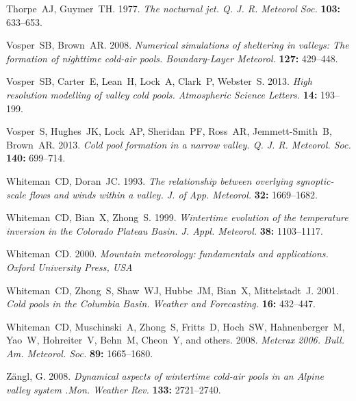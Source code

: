 \documentclass[times]{qjrms4}
\begin{document}
\begin{thebibliography}{99}
Thorpe~AJ, Guymer~TH. 1977. \emph{The nocturnal jet. Q. J. R. Meteorol Soc.} {\bf 103:} 633--653.

Vosper~SB, Brown~AR. 2008. \emph{Numerical simulations of sheltering in valleys: The formation of nighttime cold-air pools. Boundary-Layer Meteorol.} {\bf 127:} 429--448.

Vosper~SB, Carter~E, Lean~H, Lock~A, Clark~P, Webster~S. 2013. \emph{High resolution modelling of valley cold pools. Atmospheric Science Letters.} {\bf 14:} 193--199.

Vosper~S, Hughes~JK, Lock~AP, Sheridan~PF, Ross~AR, Jemmett-Smith~B, Brown~AR. 2013. \emph{Cold pool formation in a narrow valley. Q. J. R. Meteorol. Soc.} {\bf 140:} 699--714.

Whiteman~CD, Doran~JC. 1993. \emph{The relationship between overlying synoptic-scale flows and winds within a valley. J. of App. Meteorol.} {\bf 32:} 1669--1682.

Whiteman~CD, Bian~X, Zhong~S. 1999. \emph{Wintertime evolution of the temperature inversion in the Colorado Plateau Basin. J. Appl. Meteorol.} {\bf 38:} 1103--1117.

Whiteman~CD. 2000. \emph{Mountain meteorology: fundamentals and applications. Oxford University Press, USA}

Whiteman~CD, Zhong~S, Shaw~WJ, Hubbe~JM, Bian~X, Mittelstadt~J. 2001. \emph{Cold pools in the Columbia Basin. Weather and Forecasting.} {\bf 16:} 432--447.

Whiteman~CD, Muschinski~A, Zhong~S, Fritts~D, Hoch~SW, Hahnenberger~M, Yao~W, Hohreiter~V, Behn~M, Cheon~Y, and others. 2008. \emph{Metcrax 2006. Bull. Am. Meteorol. Soc.} {\bf 89:} 1665--1680.

Z{\"a}ngl, G. 2008. \emph{Dynamical aspects of wintertime cold-air pools in an Alpine valley system .Mon. Weather Rev.} {\bf 133:} 2721--2740.

\end{thebibliography}
\end{document}

